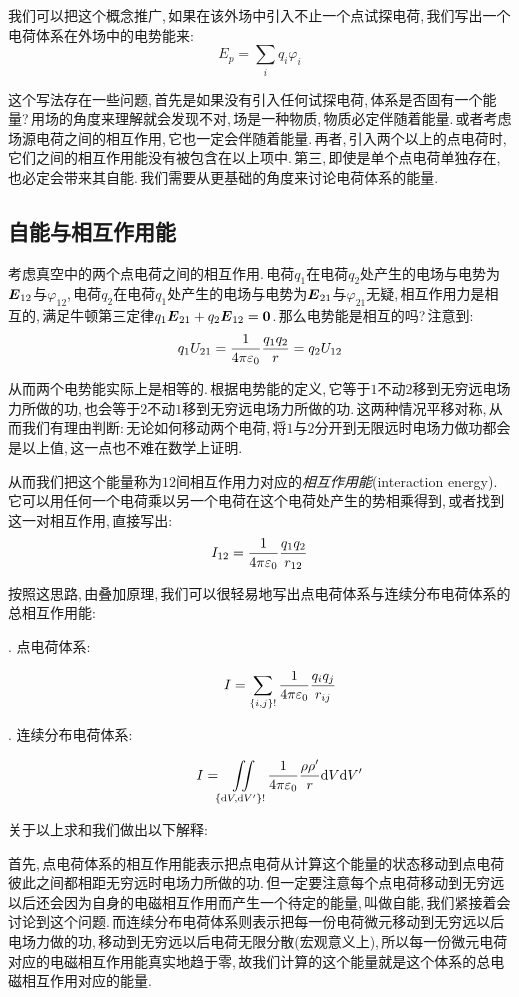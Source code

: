 我们可以把这个概念推广,\,如果在该外场中引入不止一个点试探电荷,\,我们写出一个电荷体系在外场中的电势能来:
\[E_p=\sum_i q_i\varphi_i\]

这个写法存在一些问题,\,首先是如果没有引入任何试探电荷,\,体系是否固有一个能量?\,用场的角度来理解就会发现不对,\,场是一种物质,\,物质必定伴随着能量.\,或者考虑场源电荷之间的相互作用,\,它也一定会伴随着能量.\,再者,\,引入两个以上的点电荷时,\,它们之间的相互作用能没有被包含在以上项中.\,第三,\,即使是单个点电荷单独存在,\,也必定会带来其自能.\,我们需要从更基础的角度来讨论电荷体系的能量.




\subsection{自能与相互作用能}

考虑真空中的两个点电荷之间的相互作用.\,电荷$q_1$在电荷$q_2$处产生的电场与电势为$\boldsymbol{E}_{12}$与$\varphi_{12}$,\,电荷$q_2$在电荷$q_1$处产生的电场与电势为$\boldsymbol{E}_{21}$与$\varphi_{21}$无疑,\,相互作用力是相互的,\,满足牛顿第三定律$q_1\boldsymbol{E}_{21}+q_2\boldsymbol{E}_{12}=\boldsymbol{0}$.\,那么电势能是相互的吗?\,注意到:
\[q_1U_{21}=\frac{1}{4\pi\varepsilon_0}\frac{q_1q_2}{r}=q_2U_{12}\]

从而两个电势能实际上是相等的.\,根据电势能的定义,\,它等于$1$不动$2$移到无穷远电场力所做的功,\,也会等于$2$不动$1$移到无穷远电场力所做的功.\,这两种情况平移对称,\,从而我们有理由判断:\,无论如何移动两个电荷,\,将$1$与$2$分开到无限远时电场力做功都会是以上值,\,这一点也不难在数学上证明.

从而我们把这个能量称为$12$间相互作用力对应的\emph{相互作用能}(interaction energy).\,它可以用任何一个电荷乘以另一个电荷在这个电荷处产生的势相乘得到,\,或者找到这一对相互作用,\,直接写出:
\[I_{12}=\frac{1}{4\pi\varepsilon_0}\frac{q_1q_2}{r_{12}}\]

按照这思路,\,由叠加原理,\,我们可以很轻易地写出点电荷体系与连续分布电荷体系的总相互作用能:
\begin{description}
	\item[{. 点电荷体系:}]
	\[I=\sum_{\{i,j\}!} \frac{1}{4\pi\varepsilon_0}\frac{q_iq_j}{r_{ij}}\]
	\item[{. 连续分布电荷体系:}]
	\[I= \iint\limits_{\{\textrm{d} V,\textrm{d} V'\}!}\frac{1}{4\pi\varepsilon_0}\frac{\rho\rho'}{r}\textrm{d} V\textrm{d} V'\]
\end{description}

关于以上求和我们做出以下解释:

首先,\,点电荷体系的相互作用能表示把点电荷从计算这个能量的状态移动到点电荷彼此之间都相距无穷远时电场力所做的功.\,但一定要注意每个点电荷移动到无穷远以后还会因为自身的电磁相互作用而产生一个待定的能量,\,叫做自能,\,我们紧接着会讨论到这个问题.\,而连续分布电荷体系则表示把每一份电荷微元移动到无穷远以后电场力做的功,\,移动到无穷远以后电荷无限分散(宏观意义上),\,所以每一份微元电荷对应的电磁相互作用能真实地趋于零,\,故我们计算的这个能量就是这个体系的总电磁相互作用对应的能量.

